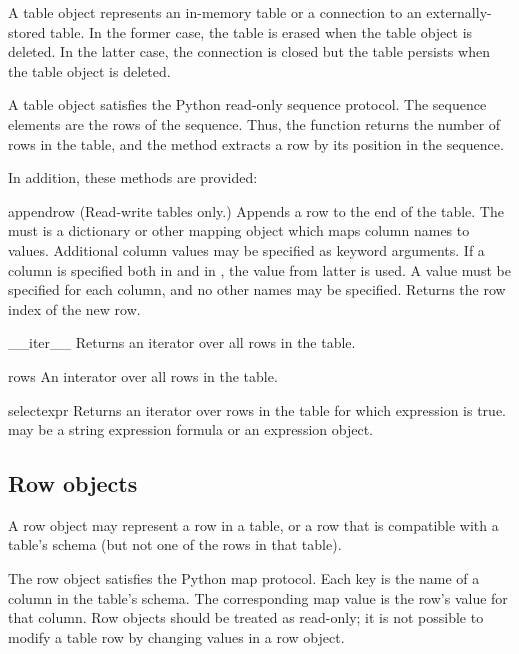 A table object represents an in-memory table or a connection to an
externally-stored table.  In the former case, the table is erased when
the table object is deleted.  In the latter case, the connection is
closed but the table persists when the table object is deleted.

A table object satisfies the Python read-only sequence protocol.  The
sequence elements are the rows of the sequence.  Thus, the
 function returns the number of rows in the table, and
the  method extracts a row by its position in the
sequence. 

In addition, these methods are provided:

\begin{methoddesc}{append}{row}
 (Read-write tables only.)  Appends a row to the end of the table.  The
  must is a dictionary or other mapping object which maps
 column names to values.  Additional column values may be specified as
 keyword arguments.  If a column is specified both in  and in
 , the value from latter is used.  A value must be
 specified for each column, and no other names may be specified.
 Returns the row index of the new row.
\end{methoddesc}

\begin{methoddesc}{__iter__}{}
 Returns an iterator over all rows in the table.
\end{methoddesc}

\begin{memberdesc}{rows}
 An interator over all rows in the table.
\end{memberdesc}

\begin{methoddesc}{select}{expr}
 Returns an iterator over rows in the table for which expression
  is true.   may be a string expression formula or
 an expression object.
\end{methoddesc}


\subsection{Row objects}

A row object may represent a row in a table, or a row that is compatible
with a table's schema (but not one of the rows in that table).

The row object satisfies the Python map protocol.  Each key is the name
of a column in the table's schema.  The corresponding map value is the
row's value for that column.  Row objects should be treated as
read-only; it is not possible to modify a table row by changing values
in a row object.

